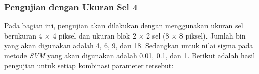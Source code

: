 \subsubsection{Pengujian dengan Ukuran Sel 4}
\noindent Pada bagian ini, pengujian akan dilakukan dengan menggunakan ukuran sel berukuran 4 $\times$ 4 piksel dan ukuran blok 2 $\times$ 2 sel (8 $\times$ 8 piksel). Jumlah bin yang akan digunakan adalah 4, 6, 9, dan 18. Sedangkan untuk nilai sigma pada metode \textit{SVM} yang akan digunakan adalah 0.01, 0.1, dan 1. Berikut adalah hasil pengujian untuk setiap kombinasi parameter tersebut:
